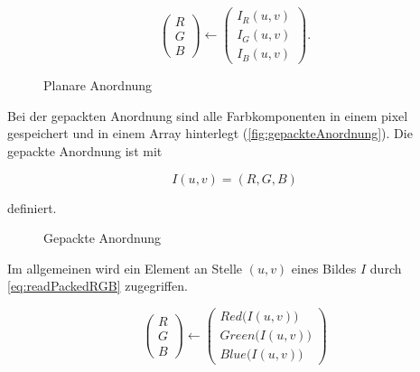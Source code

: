 \begin{equation}
	\begin{pmatrix}
		R\\
		G\\
		B
	\end{pmatrix}
	\leftarrow
	\begin{pmatrix}
		I_R\left(u,v\right)\\
		I_G\left(u,v\right)\\
		I_B\left(u,v\right)
	\end{pmatrix}.
	\label{eq:readPlanarImage}
\end{equation}

\begin{figure}[!ht]
	\centering
	\def\svgwidth{.5\columnwidth}
	
	\caption{Planare Anordnung}
	\label{fig:planareAnordnung}
\end{figure}

Bei der gepackten Anordnung sind alle Farbkomponenten in einem \gls{pixel} gespeichert und in einem Array hinterlegt (\autoref{fig:gepackteAnordnung}). Die gepackte Anordnung ist mit

\begin{equation}
	I\left(u,v\right) = \left(R,G,B\right)
	\label{eq:packedImage}
\end{equation}

definiert.

\begin{figure}[!ht]
	\centering
	\def\svgwidth{.5\columnwidth}
	
	\caption{Gepackte Anordnung}
	\label{fig:gepackteAnordnung}
\end{figure}

Im allgemeinen wird ein Element an Stelle $(u,v)$ eines Bildes $I$ durch \eqref{eq:readPackedRGB} zugegriffen.

\begin{equation}
	\begin{pmatrix}
		R\\
		G\\
		B
	\end{pmatrix}
	\leftarrow
	\begin{pmatrix}
		Red\bigl(I\left(u,v\right)\bigr)\\
		Green\bigl(I\left(u,v\right)\bigr)\\
		Blue\bigl(I\left(u,v\right)\bigr)
	\end{pmatrix}
	\label{eq:readPackedRGB}
\end{equation}

